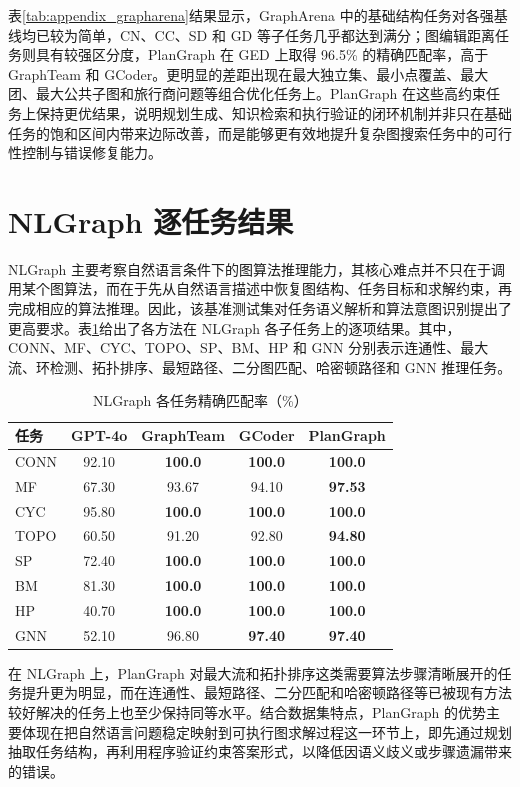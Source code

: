 表\ref{tab:appendix_grapharena}结果显示，GraphArena 中的基础结构任务对各强基线均已较为简单，CN、CC、SD 和 GD 等子任务几乎都达到满分；图编辑距离任务则具有较强区分度，PlanGraph 在 GED 上取得 96.5\% 的精确匹配率，高于 GraphTeam 和 GCoder。更明显的差距出现在最大独立集、最小点覆盖、最大团、最大公共子图和旅行商问题等组合优化任务上。PlanGraph 在这些高约束任务上保持更优结果，说明规划生成、知识检索和执行验证的闭环机制并非只在基础任务的饱和区间内带来边际改善，而是能够更有效地提升复杂图搜索任务中的可行性控制与错误修复能力。

\section{NLGraph 逐任务结果}

NLGraph 主要考察自然语言条件下的图算法推理能力，其核心难点并不只在于调用某个图算法，而在于先从自然语言描述中恢复图结构、任务目标和求解约束，再完成相应的算法推理\cite{chen2024nlgraph}。因此，该基准测试集对任务语义解析和算法意图识别提出了更高要求。表\ref{tab:appendix_nlgraph}给出了各方法在 NLGraph 各子任务上的逐项结果。其中，CONN、MF、CYC、TOPO、SP、BM、HP 和 GNN 分别表示连通性、最大流、环检测、拓扑排序、最短路径、二分图匹配、哈密顿路径和 GNN 推理任务。

\begin{table}[H]
\centering
\caption{NLGraph 各任务精确匹配率（\%）}
\label{tab:appendix_nlgraph}
\begin{tabular}{lcccc}
\toprule
任务 & GPT-4o & GraphTeam & GCoder & PlanGraph \\
\midrule
CONN & 92.10 & \textbf{100.0} & \textbf{100.0} & \textbf{100.0} \\
MF & 67.30 & 93.67 & 94.10 & \textbf{97.53} \\
CYC & 95.80 & \textbf{100.0} & \textbf{100.0} & \textbf{100.0} \\
TOPO & 60.50 & 91.20 & 92.80 & \textbf{94.80} \\
SP & 72.40 & \textbf{100.0} & \textbf{100.0} & \textbf{100.0} \\
BM & 81.30 & \textbf{100.0} & \textbf{100.0} & \textbf{100.0} \\
HP & 40.70 & \textbf{100.0} & \textbf{100.0} & \textbf{100.0} \\
GNN & 52.10 & 96.80 & \textbf{97.40} & \textbf{97.40} \\
\bottomrule
\end{tabular}
\end{table}

在 NLGraph 上，PlanGraph 对最大流和拓扑排序这类需要算法步骤清晰展开的任务提升更为明显，而在连通性、最短路径、二分匹配和哈密顿路径等已被现有方法较好解决的任务上也至少保持同等水平。结合数据集特点，PlanGraph 的优势主要体现在把自然语言问题稳定映射到可执行图求解过程这一环节上，即先通过规划抽取任务结构，再利用程序验证约束答案形式，以降低因语义歧义或步骤遗漏带来的错误。


